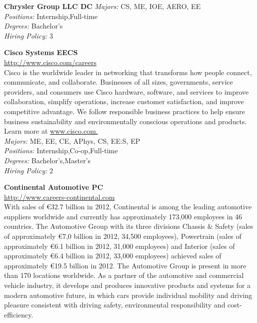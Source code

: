\documentclass[twoside]{article}
\begin{document}
\begin{center}
\begin{multicols}{2}
\begin{minipage}{.95\columnwidth}{\Large\bf Chrysler Group LLC \hfill DC}
    \emph{Majors:} CS, ME, IOE, AERO, EE\\
    \emph{Positions:} Internship,Full-time\\
    \emph{Degrees:} Bachelor's\\
    \emph{Hiring Policy:} 3\\
\end{minipage}
 \begin{minipage}{.95\columnwidth}{\Large\bf Cisco Systems \hfill EECS}\\
    \url{http://www.cisco.com/careers}\\
    Cisco is the worldwide leader in networking that transforms how people connect, communicate, and collaborate. Businesses of all sizes, governments, service providers, and consumers use Cisco hardware, software, and services to improve collaboration, simplify operations, increase customer satisfaction, and improve competitive advantage. We follow responsible business practices to help ensure business sustainability and environmentally conscious operations and products. Learn more at \url{www.cisco.com.}\\
    \emph{Majors:} ME, EE, CE, APhys, CS, EE:S, EP\\
    \emph{Positions:} Internship,Co-op,Full-time\\
    \emph{Degrees:} Bachelor's,Master's\\
    \emph{Hiring Policy:} 2\\
\end{minipage}
 \begin{minipage}{.95\columnwidth}{\Large\bf Continental Automotive \hfill PC}\\
    \url{http://www.careers-continental.com}\\
    With sales of €32.7 billion in 2012, Continental is among the leading automotive suppliers worldwide and currently has approximately 173,000 employees in 46 countries. The Automotive Group with its three divisions Chassis \& Safety (sales of approximately €7,0 billion in 2012, 34,500 employees), Powertrain (sales of approximately €6.1 billion in 2012, 31,000 employees) and Interior (sales of approximately €6.4 billion in 2012, 33,000 employees) achieved sales of approximately €19.5 billion in 2012. The Automotive Group is present in more than 170 locations worldwide. As a partner of the automotive and commercial vehicle industry, it develops and produces innovative products and systems for a modern automotive future, in which cars provide individual mobility and driving pleasure consistent with driving safety, environmental responsibility and cost-efficiency.\\

\end{minipage}
\end{multicols}
\end{center}
\end{document}
